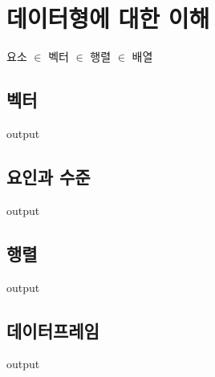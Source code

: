 \documentclass{report}
\begin{document}
\section{데이터형에 대한 이해}


요소 $\in$ 벡터 $\in$ 행렬 $\in$ 배열 

\subsection{벡터}

\begin{Schunk}
\begin{Soutput}
output
\end{Soutput}
\end{Schunk}

\subsection{요인과 수준}

\begin{Schunk}
\begin{Soutput}
output
\end{Soutput}
\end{Schunk}

\subsection{행렬}

\begin{Schunk}
\begin{Soutput}
output
\end{Soutput}
\end{Schunk}

\subsection{데이터프레임}

\begin{Schunk}
\begin{Soutput}
output
\end{Soutput}
\end{Schunk}
\end{document}
